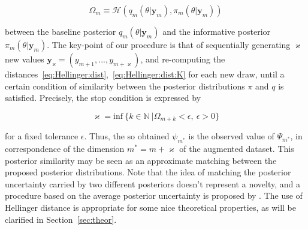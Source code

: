 \documentclass{statsoc}
\begin{document}
\begin{equation}
\Omega_{m} \equiv \mathcal{H}(q_{m}(\theta|\bm{y}_{m}), \pi_{m}(\theta|\bm{y}_{m}))
\label{eq:Hellinger:dist:K}
\end{equation}

 between the baseline posterior $q_{m}(\theta|\bm{y}_{m})$ and the informative posterior $\pi_{m}(\theta|\bm{y}_{m})$. The key-point of our procedure is that of sequentially generating $\varkappa$ new values $\bm{y}_{\varkappa}=(y_{m+1},...,y_{m+\varkappa})$, and re-computing the distances~\eqref{eq:Hellinger:dist},~\eqref{eq:Hellinger:dist:K} for each new draw, until a certain condition of similarity between the posterior distributions $\pi$ and $q$ is satisfied. Precisely, the stop condition is expressed by

\begin{equation}
\varkappa={\mbox{inf}}\ \{k \in \mathbb{N}\ | \Omega_{m+k} < \epsilon, \ \epsilon>0 \}
\label{eq:pess}
\end{equation}

for a fixed tolerance $\epsilon$. Thus, the so obtained $\psi_{m^{*}}$ is the observed value of $\Psi_{m^{*}}$, in correspondence of the dimension $m^{*}=m+\varkappa$ of the augmented dataset. This posterior similarity may be seen as an approximate matching between the proposed posterior distributions.  
 Note that the idea of matching the posterior uncertainty carried by two different posteriors doesn't represent a novelty, and a procedure based on the average posterior uncertainty is proposed by \cite{reimherr2014being}. The use of Hellinger distance is appropriate for some nice theoretical properties, as will be clarified in Section~\ref{sec:theor}.  
\end{document}
